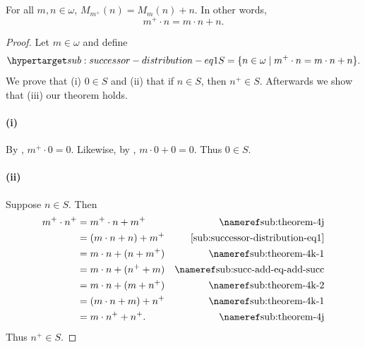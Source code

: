 \documentclass{report}
\begin{document}
\subsection{}%

\begin{lemma}

  For all $m, n \in \omega$, $M_{m^+}(n) = M_m(n) + n$.
  In other words, $$m^+ \cdot n = m \cdot n + n.$$

\end{lemma}

\begin{proof}


  Let $m \in \omega$ and define
    \begin{equation}
      \hyperlabel{sub:successor-distribution-eq1}
      S = \{n \in \omega \mid m^+ \cdot n = m \cdot n + n\}.
    \end{equation}
  We prove that (i) $0 \in S$ and (ii) that if $n \in S$, then $n^+ \in S$.
  Afterwards we show that (iii) our theorem holds.

  \paragraph{(i)}%

    By , $m^+ \cdot 0 = 0$.
    Likewise, by , $m \cdot 0 + 0 = 0$.
    Thus $0 \in S$.

  \paragraph{(ii)}%

    Suppose $n \in S$.
    Then
      \begin{align*}
        m^+ \cdot n^+
          & = m^+ \cdot n + m^+ & \textref{sub:theorem-4j} \\
          & = (m \cdot n + n) + m^+ & \eqref{sub:successor-distribution-eq1} \\
          & = m \cdot n + (n + m^+) & \textref{sub:theorem-4k-1} \\
          & = m \cdot n + (n^+ + m) & \textref{sub:succ-add-eq-add-succ} \\
          & = m \cdot n + (m + n^+) & \textref{sub:theorem-4k-2} \\
          & = (m \cdot n + m) + n^+ & \textref{sub:theorem-4k-1} \\
          & = m \cdot n^+ + n^+. & \textref{sub:theorem-4j}
      \end{align*}
    Thus $n^+ \in S$.


\end{proof}
\end{document}
